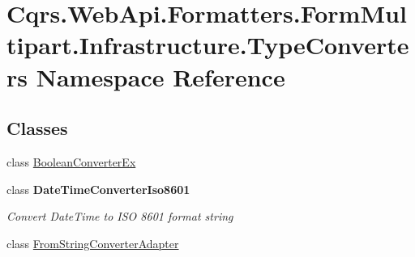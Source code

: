 \hypertarget{namespaceCqrs_1_1WebApi_1_1Formatters_1_1FormMultipart_1_1Infrastructure_1_1TypeConverters}{}\section{Cqrs.\+Web\+Api.\+Formatters.\+Form\+Multipart.\+Infrastructure.\+Type\+Converters Namespace Reference}
\label{namespaceCqrs_1_1WebApi_1_1Formatters_1_1FormMultipart_1_1Infrastructure_1_1TypeConverters}
\subsection*{Classes}
\begin{DoxyCompactItemize}
\item 
class \hyperlink{classCqrs_1_1WebApi_1_1Formatters_1_1FormMultipart_1_1Infrastructure_1_1TypeConverters_1_1BooleanConverterEx}{Boolean\+Converter\+Ex}
\item 
class {\bfseries Date\+Time\+Converter\+Iso8601}
\begin{DoxyCompactList}\small\item\em Convert Date\+Time to I\+SO 8601 format string \end{DoxyCompactList}\item 
class \hyperlink{classCqrs_1_1WebApi_1_1Formatters_1_1FormMultipart_1_1Infrastructure_1_1TypeConverters_1_1FromStringConverterAdapter}{From\+String\+Converter\+Adapter}
\end{DoxyCompactItemize}

